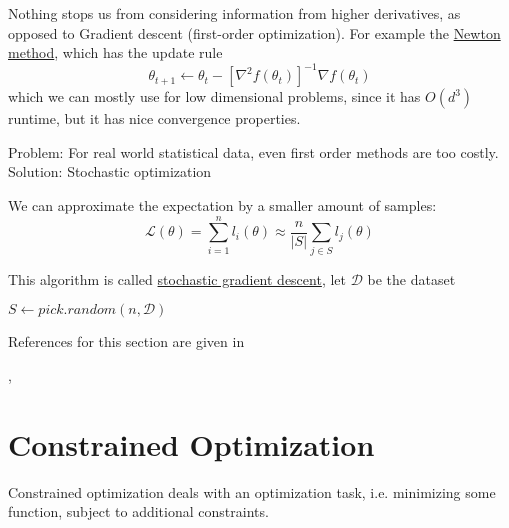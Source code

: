 \documentclass[12 pt]{article}        	%
\begin{document}
\begin{rmk}
    Nothing stops us from considering information from higher derivatives, as opposed to Gradient descent (first-order optimization).
    For example the \underline{Newton method}, which has the update rule
    \[
        \theta_{ t + 1 } \leftarrow \theta_t - [ \nabla^2 f ( \theta_t ) ]^{ - 1 } \nabla f ( \theta_t ) 
    \]
    which we can mostly use for low dimensional problems, since it has $ O ( d^3 ) $ runtime, but it has nice convergence properties.
\end{rmk}

Problem:
For real world statistical data, even first order methods are too costly.
Solution:
Stochastic optimization

We can approximate the expectation by a smaller amount of samples:
\[
    \mathcal{ L } ( \theta ) 
    =
    \sum_{ i = 1 }^n l_i ( \theta ) 
    \approx 
    \frac{ n }{ \lvert S \rvert } \sum_{ j \in S } l_j ( \theta )
\]

\begin{algo}
    This algorithm is called \underline{stochastic gradient descent},
    let $ \mathcal{ D } $ be the dataset

    \begin{algorithmic}
                    \State $ S \gets pick.random ( n , \mathcal{ D } ) $
                    \EndFor
                \EndWhile
            \EndFor
        \State {}
    \end{algorithmic}
\end{algo}

References for this section are given in
\begin{center}
    \cite[ch.8.1-8.4]{pml1Book}, \cite[ch.6]{prince2023understanding}
\end{center}

\section{Constrained Optimization}

Constrained optimization deals with an optimization task, i.e. minimizing some function, subject to additional constraints.
\end{document}
